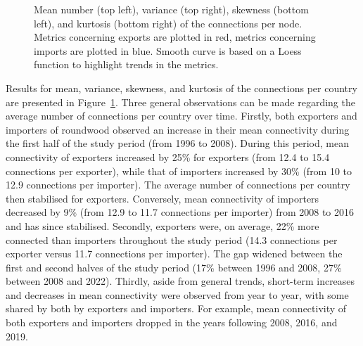 \documentclass[
  authoryear,
  review,
  3p]{elsarticle}
\begin{document}
\begin{figure}[t]


\caption{\label{fig-network-connectivity}Mean number (top left),
variance (top right), skewness (bottom left), and kurtosis (bottom
right) of the connections per node. Metrics concerning exports are
plotted in red, metrics concerning imports are plotted in blue. Smooth
curve is based on a Loess function to highlight trends in the metrics.}

\end{figure}%

Results for mean, variance, skewness, and kurtosis of the connections
per country are presented in Figure~\ref{fig-network-connectivity}.
Three general observations can be made regarding the average number of
connections per country over time. Firstly, both exporters and importers
of roundwood observed an increase in their mean connectivity during the
first half of the study period (from 1996 to 2008). During this period,
mean connectivity of exporters increased by 25\% for exporters (from
12.4 to 15.4 connections per exporter), while that of importers
increased by 30\% (from 10 to 12.9 connections per importer). The
average number of connections per country then stabilised for exporters.
Conversely, mean connectivity of importers decreased by 9\% (from 12.9
to 11.7 connections per importer) from 2008 to 2016 and has since
stabilised. Secondly, exporters were, on average, 22\% more connected
than importers throughout the study period (14.3 connections per
exporter versus 11.7 connections per importer). The gap widened between
the first and second halves of the study period (17\% between 1996 and
2008, 27\% between 2008 and 2022). Thirdly, aside from general trends,
short-term increases and decreases in mean connectivity were observed
from year to year, with some shared by both by exporters and importers.
For example, mean connectivity of both exporters and importers dropped
in the years following 2008, 2016, and 2019.
\end{document}
